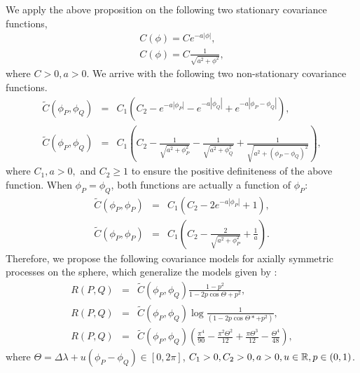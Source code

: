 \noi We apply the above proposition on the following two stationary covariance functions, 						
			\begin{eqnarray*}
				C(\phi) = Ce^{-a|\phi|}, \\
				C(\phi) = C\frac{1}{\sqrt{a^2+\phi^2}},
			\end{eqnarray*}
\noi where $C > 0, a > 0$. We arrive with the following two non-stationary covariance functions.  
			\begin{eqnarray}
				\label{Cm_model1}
				\tilde{C}(\phi_P, \phi_Q) &=& C_1(C_2 - e^{-a|\phi_P|} - e^{-a|\phi_Q|} + e^{-a|\phi_P - \phi_Q|}), \\
				\label{Cm_model2}
				\tilde{C}(\phi_P, \phi_Q) &=& C_1\left(C_2 - \frac{1}{\sqrt{a^2+\phi_P^2}} - \frac{1}{\sqrt{a^2+\phi_Q^2}} + \frac{1}{\sqrt{a^2+(\phi_P-\phi_Q)^2}}\right),
			\end{eqnarray}					      		
where $C_1, a > 0,$ and $C_2 \ge 1$ to ensure the positive definiteness of the above function. When $\phi_P = \phi_Q$, both functions are actually a function of $\phi_P$:		      		
			\begin{eqnarray*}
				\tilde{C}(\phi_P, \phi_P) &=& C_1(C_2 - 2e^{-a|\phi_P|} + 1), \\
				\tilde{C}(\phi_P, \phi_P) &=& C_1\left(C_2 - \frac{2}{\sqrt{a^2+\phi_P^2}} + \frac{1}{a}\right).
			\end{eqnarray*}		
Therefore, we propose the following covariance models for axially symmetric processes on the sphere, which generalize the models given by \cite[model 1, model 4, model 5]{Huang2012}:
			\begin{eqnarray}
				R(P,Q) &=& \tilde{C}(\phi_P, \phi_Q) \frac{1-p^2}{1-2p \cos\Theta+p^2}, \label{model4} \\
				R(P,Q) &=& \tilde{C}(\phi_P, \phi_Q) \log\frac{1}{(1-2p\cos\Theta* + p^2)}, \label{model5} \\
				R(P,Q) &=& \tilde{C}(\phi_P, \phi_Q) \left(\frac{\pi^4}{90}-\frac{\pi^2\Theta^2}{12}+\frac{\pi\Theta^3}{12}-\frac{\Theta^4}{48}\right), \label{model6}
			\end{eqnarray}
where $\Theta=\Delta\lambda+u(\phi_P-\phi_Q) \in [0,2\pi ] $, $C_1 > 0, C_2 > 0, a>0, u\in \mathbb{R}, p\in(0,1)$. \\
					
